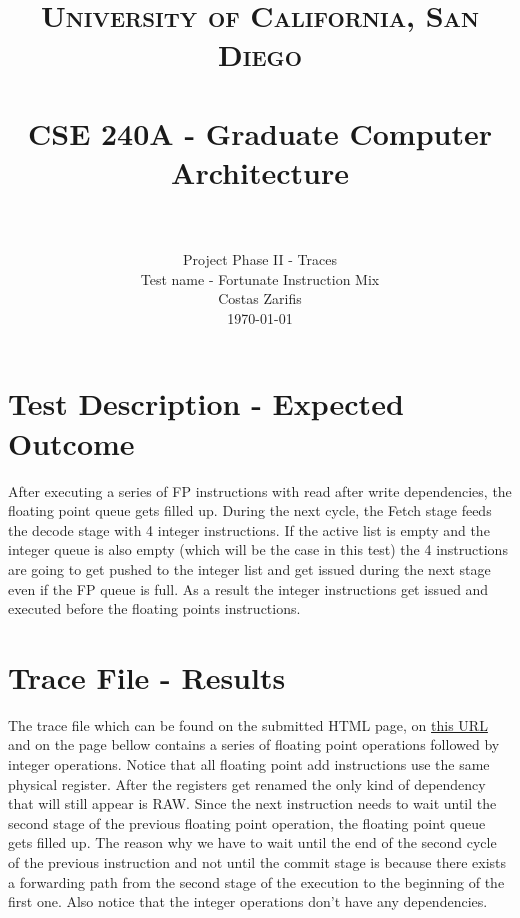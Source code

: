 \documentclass[paper=a4, fontsize=11pt]{scrartcl}
\title{
		\usefont{OT1}{bch}{b}{n}
		\normalfont \normalsize \textsc{University of California, San Diego} \\ [25pt]
		\horrule{0.5pt} \\[0.4cm]
		\huge CSE 240A - Graduate Computer Architecture \\
		\horrule{2pt} \\[0.5cm]
}
\author{
		\normalfont 			Project Phase II - Traces	\\				\normalsize
		Test name - Fortunate Instruction Mix  \\
        \normalfont Costas Zarifis\\[-3pt]		\normalsize
        \today
}
\date{}
\numberwithin{equation}{section}		%
\numberwithin{figure}{section}			%
\numberwithin{table}{section}				%
\begin{document}
\maketitle
\section{Test Description - Expected Outcome}

After executing a series of FP instructions with
read after write dependencies, the floating point queue gets filled up. During the next cycle, the Fetch stage feeds the decode stage with 4
integer instructions. If the
active list is empty and the integer queue is
also empty (which will be the case in this test) the 4 instructions are going to
get pushed to the integer list and get issued
during the next stage even if the FP queue is
full. As a result the integer instructions get issued and executed before the floating points instructions.

\section{Trace File - Results}
The trace file which can be found on the submitted HTML page, on \href{http://zarifis.info/cse240AII.html}{this URL} and on the page bellow contains a series of floating point operations followed by integer operations. Notice that all floating point add instructions use the same physical register. After the registers get renamed the only kind of dependency that will still appear is RAW. Since the next instruction needs to wait until the second stage of the previous floating point operation, the floating point queue gets filled up. The reason why we have to wait until the end of the second cycle of the previous instruction and not until the commit stage is because there exists a forwarding path from the second stage of the execution to the beginning of the first one. Also notice that the integer operations don't have any dependencies.







\end{document}
